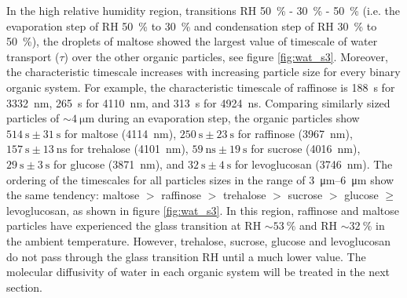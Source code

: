 In the high relative humidity region, transitions RH \SI{50}{\percent} - \SI{30}{\percent} - \SI{50}{\percent} (i.e. the evaporation step of RH \SI{50}{\percent} to \SI{30}{\percent} and condensation step of RH \SI{30}{\percent} to \SI{50}{\percent}), the droplets of maltose showed the largest value of timescale of water transport ($\tau$) over the other organic particles, see figure \ref{fig:wat_s3}. Moreover, the characteristic timescale increases with increasing particle size for every binary organic system. For example, the characteristic timescale of raffinose is \SI{188}{\second} for \SI{3332}{\nano\meter}, \SI{265}{\second} for \SI{4110}{\nano\meter}, and \SI{313}{\second} for \SI{4924}{\nano\second}. Comparing similarly sized particles of $\sim \SI{4}{\micro\meter}$ during an evaporation step, the organic particles show $\SI{514}{\second} \pm \SI{31}{\second}$ for maltose (\SI{4114}{\nano\meter}), $\SI{250}{\second} \pm \SI{23}{\second}$ for raffinose (\SI{3967}{\nano\meter}), $\SI{157}{\second} \pm \SI{13}{\nano\second}$ for trehalose (\SI{4101}{\nano\meter}), $\SI{59}{\nano\second} \pm \SI{19}{\second}$ for sucrose (\SI{4016}{\nano\meter}), $\SI{29}{\second} \pm \SI{3}{\second}$ for glucose (\SI{3871}{\nano\meter}), and $\SI{32}{\second} \pm \SI{4}{\second}$ for levoglucosan (\SI{3746}{\nano\meter}). The ordering of the timescales for all particles sizes in the range of \SIrange[range-phrase=--]{3}{6}{\micro\meter} show the same tendency: maltose $>$ raffinose $>$ trehalose $>$ sucrose $>$ glucose $\ge$ levoglucosan, as shown in figure \ref{fig:wat_s3}. In this region, raffinose and maltose particles have experienced the glass transition at RH $\sim \SI{53}{\percent}$ and RH $\sim\SI{32}{\percent}$ in the ambient temperature.\cite{Song2016a}\cite{Tong2011} However, trehalose, sucrose, glucose and levoglucosan do not pass through the glass transition RH until a much lower value. The molecular diffusivity of water in each organic system will be treated in the next section.

